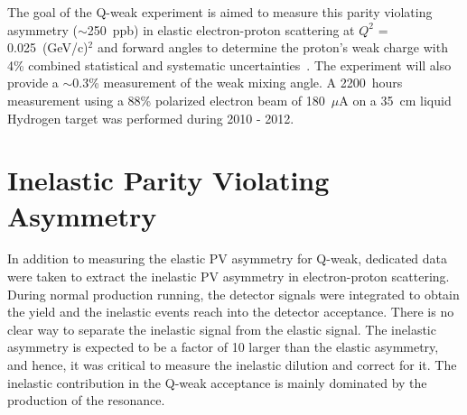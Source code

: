 The goal of the Q-weak experiment is aimed to measure this parity violating asymmetry ($\sim$250~ppb) in elastic electron-proton scattering at $Q^{2}$ = 0.025~(GeV/c)$^{2}$ and forward angles to determine the proton's weak charge with 4\% combined statistical and systematic uncertainties~\cite{qweak_proposal_2007}.
The experiment will also provide a $\sim$0.3\% measurement of the weak mixing angle. 
A 2200~hours measurement using a 88\% polarized electron beam of 180~$\mu$A on a 35~cm liquid Hydrogen target was performed during 2010 - 2012.


\section{Inelastic Parity Violating Asymmetry}
\label{Inelastic Parity Violating Asymmetry}

In addition to measuring the elastic PV asymmetry for Q-weak, dedicated data were taken to extract the inelastic PV asymmetry in electron-proton scattering. During normal production running, the detector signals were integrated to obtain the yield and the inelastic events reach into the detector acceptance. There is no clear way to separate the inelastic signal from the elastic signal. The inelastic asymmetry is expected to be a factor of 10 larger than the elastic asymmetry, and hence, it was critical to measure the inelastic dilution and correct for it. The inelastic contribution in the Q-weak acceptance is mainly dominated by the production of the resonance.


